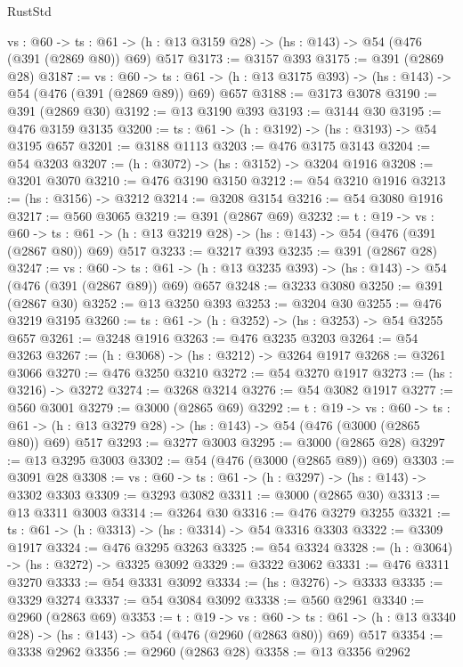 \begin{lexlean}{RustStd}
\begin{coremodule}
  {vs : @60} ->
  {ts : @61} -> (h : @13 @3159 @28) -> (hs : @143) -> @54 (@476 (@391 (@2869 @80)) @69) @517
@3173 := @3157 @393
@3175 := @391 (@2869 @28)
@3187 := {vs : @60} ->
  {ts : @61} -> (h : @13 @3175 @393) -> (hs : @143) -> @54 (@476 (@391 (@2869 @89)) @69) @657
@3188 := @3173 @3078
@3190 := @391 (@2869 @30)
@3192 := @13 @3190 @393
@3193 := @3144 @30
@3195 := @476 @3159 @3135
@3200 := {ts : @61} -> (h : @3192) -> (hs : @3193) -> @54 @3195 @657
@3201 := @3188 @1113
@3203 := @476 @3175 @3143
@3204 := @54 @3203
@3207 := (h : @3072) -> (hs : @3152) -> @3204 @1916
@3208 := @3201 @3070
@3210 := @476 @3190 @3150
@3212 := @54 @3210 @1916
@3213 := (hs : @3156) -> @3212
@3214 := @3208 @3154
@3216 := @54 @3080 @1916
@3217 := @560 @3065
@3219 := @391 (@2867 @69)
@3232 := {t : @19} ->
  {vs : @60} ->
  {ts : @61} -> (h : @13 @3219 @28) -> (hs : @143) -> @54 (@476 (@391 (@2867 @80)) @69) @517
@3233 := @3217 @393
@3235 := @391 (@2867 @28)
@3247 := {vs : @60} ->
  {ts : @61} -> (h : @13 @3235 @393) -> (hs : @143) -> @54 (@476 (@391 (@2867 @89)) @69) @657
@3248 := @3233 @3080
@3250 := @391 (@2867 @30)
@3252 := @13 @3250 @393
@3253 := @3204 @30
@3255 := @476 @3219 @3195
@3260 := {ts : @61} -> (h : @3252) -> (hs : @3253) -> @54 @3255 @657
@3261 := @3248 @1916
@3263 := @476 @3235 @3203
@3264 := @54 @3263
@3267 := (h : @3068) -> (hs : @3212) -> @3264 @1917
@3268 := @3261 @3066
@3270 := @476 @3250 @3210
@3272 := @54 @3270 @1917
@3273 := (hs : @3216) -> @3272
@3274 := @3268 @3214
@3276 := @54 @3082 @1917
@3277 := @560 @3001
@3279 := @3000 (@2865 @69)
@3292 := {t : @19} ->
  {vs : @60} ->
  {ts : @61} -> (h : @13 @3279 @28) -> (hs : @143) -> @54 (@476 (@3000 (@2865 @80)) @69) @517
@3293 := @3277 @3003
@3295 := @3000 (@2865 @28)
@3297 := @13 @3295 @3003
@3302 := @54 (@476 (@3000 (@2865 @89)) @69)
@3303 := @3091 @28
@3308 := {vs : @60} -> {ts : @61} -> (h : @3297) -> (hs : @143) -> @3302 @3303
@3309 := @3293 @3082
@3311 := @3000 (@2865 @30)
@3313 := @13 @3311 @3003
@3314 := @3264 @30
@3316 := @476 @3279 @3255
@3321 := {ts : @61} -> (h : @3313) -> (hs : @3314) -> @54 @3316 @3303
@3322 := @3309 @1917
@3324 := @476 @3295 @3263
@3325 := @54 @3324
@3328 := (h : @3064) -> (hs : @3272) -> @3325 @3092
@3329 := @3322 @3062
@3331 := @476 @3311 @3270
@3333 := @54 @3331 @3092
@3334 := (hs : @3276) -> @3333
@3335 := @3329 @3274
@3337 := @54 @3084 @3092
@3338 := @560 @2961
@3340 := @2960 (@2863 @69)
@3353 := {t : @19} ->
  {vs : @60} ->
  {ts : @61} -> (h : @13 @3340 @28) -> (hs : @143) -> @54 (@476 (@2960 (@2863 @80)) @69) @517
@3354 := @3338 @2962
@3356 := @2960 (@2863 @28)
@3358 := @13 @3356 @2962

\end{coremodule}
\end{lexlean}
